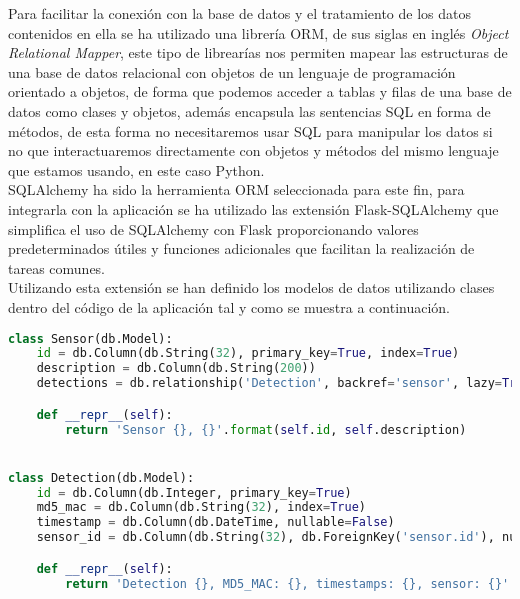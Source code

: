 \documentclass[../proyecto.tex]{subfiles}
\begin{document}
Para facilitar la conexión con la base de datos y el tratamiento de los datos contenidos en ella se ha utilizado una librería ORM, de sus siglas en inglés \textit{Object Relational Mapper}, este tipo de librearías nos permiten mapear las estructuras de una base de datos relacional con objetos de un lenguaje de programación orientado a objetos, de forma que podemos acceder a tablas y filas de una base de datos como clases y objetos, además encapsula las sentencias SQL en forma de métodos, de esta forma no necesitaremos usar SQL para manipular los datos si no que interactuaremos directamente con objetos y métodos del mismo lenguaje que estamos usando, en este caso Python.\\

SQLAlchemy \cite{sqlalchemy} ha sido la herramienta ORM seleccionada para este fin, para integrarla con la aplicación se ha utilizado las extensión Flask-SQLAlchemy \cite{flask_sqlalchemy} que simplifica el uso de SQLAlchemy con Flask proporcionando valores predeterminados útiles y funciones adicionales que facilitan la realización de tareas comunes.\\

Utilizando esta extensión se han definido los modelos de datos utilizando clases dentro del código de la aplicación tal y como se muestra a continuación.\\

\begin{minipage}{\linewidth}
\begin{lstlisting}[language=Python, caption=Definición de modelos utilizando SQLAlchemy, label={lst:sqlalchemy_models}, captionpos=b, frame=single]
class Sensor(db.Model):
    id = db.Column(db.String(32), primary_key=True, index=True)
    description = db.Column(db.String(200))
    detections = db.relationship('Detection', backref='sensor', lazy=True)

    def __repr__(self):
        return 'Sensor {}, {}'.format(self.id, self.description)


class Detection(db.Model):
    id = db.Column(db.Integer, primary_key=True)
    md5_mac = db.Column(db.String(32), index=True)
    timestamp = db.Column(db.DateTime, nullable=False)
    sensor_id = db.Column(db.String(32), db.ForeignKey('sensor.id'), nullable=False)

    def __repr__(self):
        return 'Detection {}, MD5_MAC: {}, timestamps: {}, sensor: {}'.format(self.id, self.md5_mac, self.timestamp, self.sensor_id)
\end{lstlisting}
\end{minipage}
\end{document}
